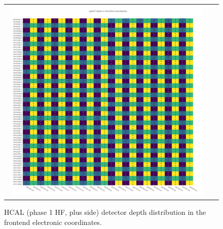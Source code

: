 \begin{figure}[htb]
 \begin{center}
  \begin{tabular}{cc}
   \includegraphics[angle=0,width=0.95\textwidth]{figures/appendix/ngHFP_Depth_in_FrontEnd.png}
  \end{tabular}
	\caption{HCAL (phase 1 HF, plus side) detector depth distribution in the frontend electronic coordinates.}
  \label{fig:lmapngHFPDepthFEC}
 \end{center}
\end{figure}
\clearpage

